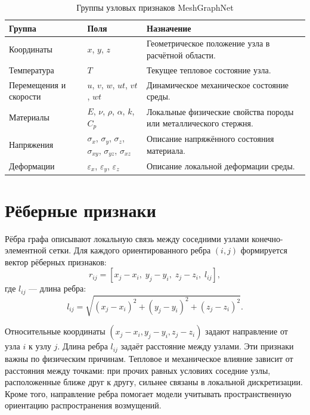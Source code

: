\begin{table}[h]
\centering
\caption{Группы узловых признаков MeshGraphNet}
\label{tab:node_features}
\begin{tabular}{|p{}|p{}|p{}|}
\hline
\textbf{Группа} & \textbf{Поля} & \textbf{Назначение} \\
\hline
Координаты & $x$, $y$, $z$ & Геометрическое положение узла в расчётной области. \\
\hline
Температура & $T$ & Текущее тепловое состояние узла. \\
\hline
Перемещения и скорости & $u$, $v$, $w$, $ut$, $vt$, $wt$ & Динамическое механическое состояние среды. \\
\hline
Материалы & $E$, $\nu$, $\rho$, $\alpha$, $k$, $C_p$ & Локальные физические свойства породы или металлического стержня. \\
\hline
Напряжения & $\sigma_x$, $\sigma_y$, $\sigma_z$, $\sigma_{xy}$, $\sigma_{yz}$, $\sigma_{xz}$ & Описание напряжённого состояния материала. \\
\hline
Деформации & $\varepsilon_x$, $\varepsilon_y$, $\varepsilon_z$ & Описание локальной деформации среды. \\
\hline
\end{tabular}
\end{table}

\section{Рёберные признаки}

Рёбра графа описывают локальную связь между соседними узлами конечно-элементной сетки. Для каждого ориентированного ребра $(i,j)$ формируется вектор рёберных признаков:
\begin{equation}
    r_{ij}=[x_j-x_i,\;y_j-y_i,\;z_j-z_i,\;l_{ij}],
\end{equation}
где $l_{ij}$ --- длина ребра:
\begin{equation}
    l_{ij}=\sqrt{(x_j-x_i)^2+(y_j-y_i)^2+(z_j-z_i)^2}.
\end{equation}

Относительные координаты $(x_j-x_i,y_j-y_i,z_j-z_i)$ задают направление от узла $i$ к узлу $j$. Длина ребра $l_{ij}$ задаёт расстояние между узлами. Эти признаки важны по физическим причинам. Тепловое и механическое влияние зависит от расстояния между точками: при прочих равных условиях соседние узлы, расположенные ближе друг к другу, сильнее связаны в локальной дискретизации. Кроме того, направление ребра помогает модели учитывать пространственную ориентацию распространения возмущений.

